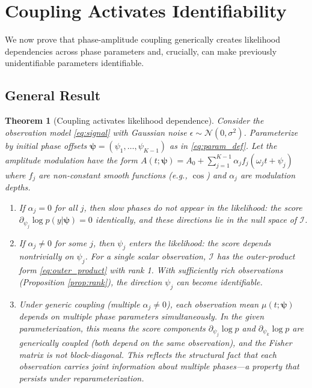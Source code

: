 \documentclass[12pt]{article}
\newtheorem{theorem}{Theorem}
\newcommand{\FIM}{\mathcal{I}}
\begin{document}
\section{Coupling Activates Identifiability}
\label{sec:coupling}

We now prove that phase-amplitude coupling generically creates likelihood dependencies across phase parameters and, crucially, can make previously unidentifiable parameters identifiable.

\subsection{General Result}

\begin{theorem}[Coupling activates likelihood dependence]
\label{thm:coupling}
Consider the observation model \eqref{eq:signal} with Gaussian noise $\epsilon \sim \mathcal{N}(0, \sigma^2)$. Parameterize by initial phase offsets $\bm{\psi} = (\psi_1, \ldots, \psi_{K-1})$ as in \eqref{eq:param_def}. Let the amplitude modulation have the form $A(t; \bm{\psi}) = A_0 + \sum_{j=1}^{K-1} \alpha_j f_j(\omega_j t + \psi_j)$ where $f_j$ are non-constant smooth functions (e.g., $\cos$) and $\alpha_j$ are modulation depths.

\begin{enumerate}
    \item[(i)] If $\alpha_j = 0$ for all $j$, then slow phases do not appear in the likelihood: the score $\partial_{\psi_j} \log p(y|\bm{\psi}) = 0$ identically, and these directions lie in the null space of $\FIM$.

    \item[(ii)] If $\alpha_j \neq 0$ for some $j$, then $\psi_j$ \emph{enters the likelihood}: the score depends nontrivially on $\psi_j$. For a single scalar observation, $\FIM$ has the outer-product form \eqref{eq:outer_product} with rank 1. With sufficiently rich observations (Proposition \ref{prop:rank}), the direction $\psi_j$ can become identifiable.

    \item[(iii)] Under generic coupling (multiple $\alpha_j \neq 0$), each observation mean $\mu(t;\bm{\psi})$ depends on multiple phase parameters simultaneously. In the given parameterization, this means the score components $\partial_{\psi_j}\log p$ and $\partial_{\psi_k}\log p$ are generically coupled (both depend on the same observation), and the Fisher matrix is not block-diagonal. This reflects the structural fact that \emph{each observation carries joint information about multiple phases}---a property that persists under reparameterization.
\end{enumerate}
\end{theorem}
\end{document}
